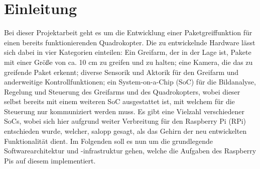 \chapter{Einleitung}
Bei dieser Projektarbeit geht es um die Entwicklung einer Paketgreiffunktion für einen
bereits funktionierenden Quadrokopter. Die zu entwickelnde Hardware lässt sich dabei
in vier Kategorien einteilen: Ein Greifarm, der in der Lage ist, Pakete mit einer Größe
von ca. 10 cm zu greifen und zu halten; eine Kamera, die das zu greifende Paket
erkennt; diverse Sensorik und Aktorik für den Greifarm und anderweitige
Kontrollfunktionen; ein System-on-a-Chip (SoC) für die Bildanalyse, Regelung und
Steuerung des Greifarms und des Quadrokopters, wobei dieser selbst bereits mit
einem weiteren SoC ausgestattet ist, mit welchem für die Steuerung nur kommuniziert
werden muss. Es gibt eine Vielzahl verschiedener SoCs, wobei sich hier aufgrund
weiter Verbreitung für den Raspberry Pi (RPi) entschieden wurde, welcher, salopp
gesagt, als das Gehirn der neu entwickelten Funktionalität dient. Im Folgenden soll es
nun um die grundlegende Softwarearchitektur und -infrastruktur gehen, welche die
Aufgaben des Raspberry Pis auf diesem implementiert.